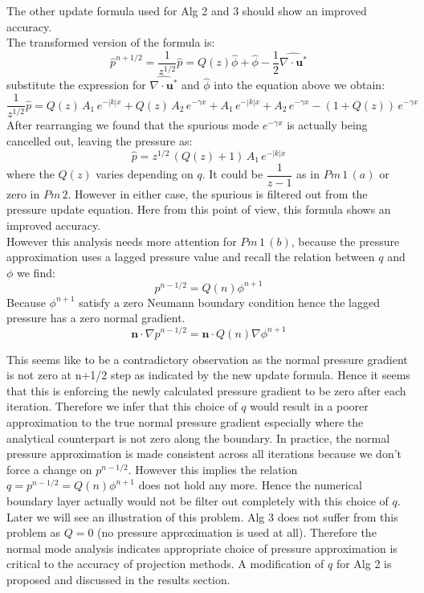 The other update formula used for Alg 2 and 3 should show an improved accuracy.\\
The transformed version of the formula is:
\begin{equation}
\hat{p}^{n+1/2} = \dfrac{1}{z^{1/2}}\hat{p} = Q(z)\hat{\phi} + \hat{\phi} - \dfrac{1}{2}\hat{\nabla \cdot \textbf{u}^*}
\end{equation}
substitute the expression for $\hat{\nabla \cdot \textbf{u}^*}$ and $\hat{\phi}$ into the equation above we obtain:
\begin{equation}
\dfrac{1}{z^{1/2}}\hat{p} = Q(z)\,A_1\,e^{-|k|x} + Q(z)\,A_2 \,e^{-\gamma x} + A_1\,e^{-|k|x} + A_2 \,e^{-\gamma x} - (1+Q(z)) \,e^{-\gamma x}
\end{equation}
After rearranging we found that the spurious mode $e^{-\gamma x}$ is actually being cancelled out, leaving the pressure as:
\begin{equation}
\hat{p} = z^{1/2}\,(Q(z) + 1)\,A_1\,e^{-|k|x} 
\end{equation}
where the $Q(z)$ varies depending on $q$. It could be $\dfrac{1}{z-1}$ as in $Pm\,1\,(a)$ or zero in $Pm\,2$. However in either case, the spurious is filtered out from the pressure update equation. Here from this point of view, this formula shows an improved accuracy.\\

However this analysis needs more attention for $Pm\,1\,(b)$, because the pressure approximation uses a lagged pressure value and recall the relation between $q$ and $\phi$ we find:
\begin{equation*}
p^{n-1/2} = Q(n)\phi^{n+1}
\end{equation*}
Because $\phi^{n+1}$ satisfy a zero Neumann boundary condition hence the lagged pressure has a zero normal gradient.
\begin{equation}
\textbf{n}\cdot \nabla p^{n-1/2} = \textbf{n}\cdot Q(n)\nabla \phi^{n+1}
\end{equation}

This seems like to be a contradictory observation as the normal pressure gradient is not zero at n+1/2 step as indicated by the new update formula. Hence it seems that this is enforcing the newly calculated pressure gradient to be zero after each iteration. Therefore we infer that this choice of $q$ would result in a poorer approximation to the true normal pressure gradient especially where the analytical counterpart is not zero along the boundary. In practice, the normal pressure approximation is made consistent across all iterations because we don't force a change on $p^{n-1/2}$. However this implies the relation $q = p^{n-1/2}= Q(n)\phi^{n+1}$ does not hold any more. Hence the numerical boundary layer actually would not be filter out completely with this choice of $q$. Later we will see an illustration of this problem. Alg 3 does not suffer from this problem as $Q = 0$ (no pressure approximation is used at all). Therefore the normal mode analysis indicates appropriate choice of pressure approximation is critical to the accuracy of projection methods. A modification of $q$ for Alg 2 is proposed and discussed in the results section.\\

